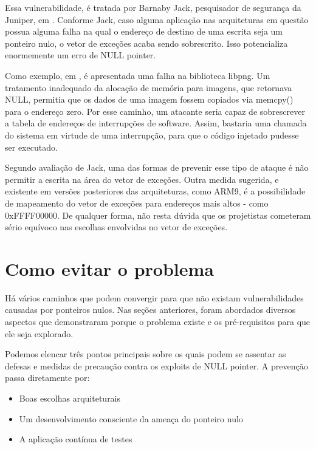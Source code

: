 			Essa vulnerabilidade, é tratada por Barnaby Jack, pesquisador de segurança da Juniper,
			em \cite{Jack2007}. Conforme Jack, caso alguma aplicação nas arquiteturas em questão
			possua alguma falha na qual o endereço de destino de uma escrita seja um ponteiro nulo,
			o vetor de exceções acaba sendo sobrescrito. Isso potencializa enormemente um erro
			de NULL pointer.


			Como exemplo, em \cite{Jack2007}, é apresentada uma falha na biblioteca libpng.
			Um tratamento inadequado da alocação de memória para imagens, que
			retornava NULL, permitia que os dados de uma imagem fossem copiados
			via memcpy() para o endereço zero. Por esse caminho, um atacante seria capaz
			de sobrescrever a tabela de endereços de interrupções de software.
			Assim, bastaria uma chamada do sistema em virtude de uma interrupção,
			para que o código injetado pudesse ser executado.

			
			Segundo avaliação de Jack, uma das formas de prevenir esse tipo de ataque é
			não permitir a escrita na área do vetor de exceções. Outra medida sugerida,
			e existente em versões posteriores das arquiteturas, como ARM9, é a possibilidade
			de mapeamento do vetor de exceções para endereços mais altos - como 0xFFFF00000.
			De qualquer forma, não resta dúvida que os projetistas cometeram sério
			equívoco nas escolhas envolvidas no vetor de exceções.
				
						

	\section{Como evitar o problema}
		Há vários caminhos que podem convergir para que não existam vulnerabilidades causadas 
		por ponteiros nulos. Nas seções anteriores, foram abordados diversos aspectos que
		demonstraram porque o problema existe e os pré-requisitos para que ele seja explorado.
		

		Podemos elencar três pontos principais sobre os quais podem se assentar as defesas
		e medidas de precaução contra os exploits de NULL pointer.
		A prevenção passa diretamente por:
		\begin{itemize}
			\item{Boas escolhas arquiteturais}
			\item{Um desenvolvimento consciente da ameaça do ponteiro nulo}
			\item{A aplicação contínua de testes}
		\end{itemize}
	
